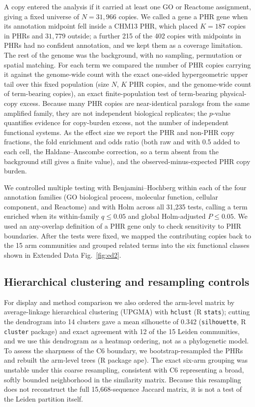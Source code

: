 \documentclass[pdflatex,mathphys]{jnl}
\begin{document}
A copy entered the analysis if it carried at least one GO or Reactome
assignment, giving a fixed universe of $N=31{,}966$ copies. We called a gene a
PHR gene when its annotation midpoint fell inside a CHM13 PHR, which placed
$K=187$ copies in PHRs and $31{,}779$ outside; a further 215 of the 402 copies
with midpoints in PHRs had no confident annotation, and we kept them as a
coverage limitation. The rest of the genome was the background, with no
sampling, permutation or spatial matching. For each term we compared the number
of PHR copies carrying it against the genome-wide count with the exact one-sided
hypergeometric upper tail over this fixed population (size $N$, $K$ PHR copies,
and the genome-wide count of term-bearing copies), an exact finite-population
test of term-bearing physical-copy excess. Because many PHR copies are
near-identical paralogs from the same amplified family, they are not independent
biological replicates; the $p$-value quantifies evidence for copy-burden excess,
not the number of independent functional systems. As the effect size we report
the PHR and non-PHR copy fractions, the fold enrichment and odds ratio (both raw
and with 0.5 added to each cell, the Haldane--Anscombe correction, so a term
absent from the background still gives a finite value), and the
observed-minus-expected PHR copy burden.

We controlled multiple testing with Benjamini--Hochberg within each of the four
annotation families (GO biological process, molecular function, cellular
component, and Reactome) and with Holm across all 31,235 tests, calling a term
enriched when its within-family $q\leq0.05$ and global Holm-adjusted
$P\leq0.05$. We used an any-overlap definition of a PHR gene only to check
sensitivity to PHR boundaries. After the tests were fixed, we mapped the
contributing copies back to the 15 arm communities and grouped related terms
into the six functional classes shown in Extended Data Fig.~\ref{fig:ed2}.

\subsection*{Hierarchical clustering and resampling controls}

For display and method comparison we also ordered the arm-level matrix by
average-linkage hierarchical clustering (UPGMA) with \texttt{hclust} (R \texttt{stats}); cutting the dendrogram into 14 clusters gave
a mean silhouette of 0.342 (\texttt{silhouette}, R \texttt{cluster} package) and exact agreement with 12 of the 15 Leiden
communities, and we use this dendrogram as a heatmap ordering, not as a
phylogenetic model. To assess the sharpness of the C6 boundary, we
bootstrap-resampled the PHRs and rebuilt the arm-level trees (R package ape).
The exact six-arm grouping was unstable under this coarse resampling,
consistent with C6 representing a broad, softly bounded neighborhood in the
similarity matrix. Because this resampling does not reconstruct the full
15,668-sequence Jaccard matrix, it is not a test of the Leiden partition
itself.
\end{document}
